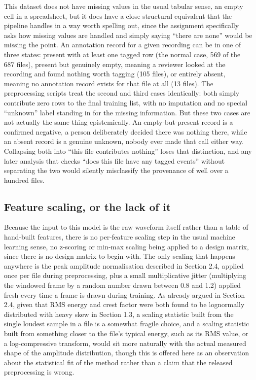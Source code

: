 \documentclass[11pt]{article}
\begin{document}
This dataset does not have missing values in the usual tabular sense, an empty cell in a spreadsheet, but it does have a close structural equivalent that the pipeline handles in a way worth spelling out, since the assignment specifically asks how missing values are handled and simply saying ``there are none'' would be missing the point. An annotation record for a given recording can be in one of three states: present with at least one tagged row (the normal case, 569 of the 687 files), present but genuinely empty, meaning a reviewer looked at the recording and found nothing worth tagging (105 files), or entirely absent, meaning no annotation record exists for that file at all (13 files). The preprocessing scripts treat the second and third cases identically: both simply contribute zero rows to the final training list, with no imputation and no special ``unknown'' label standing in for the missing information. But these two cases are not actually the same thing epistemically. An empty-but-present record is a confirmed negative, a person deliberately decided there was nothing there, while an absent record is a genuine unknown, nobody ever made that call either way. Collapsing both into ``this file contributes nothing'' loses that distinction, and any later analysis that checks ``does this file have any tagged events'' without separating the two would silently misclassify the provenance of well over a hundred files.

\subsection{Feature scaling, or the lack of it}

Because the input to this model is the raw waveform itself rather than a table of hand-built features, there is no per-feature scaling step in the usual machine learning sense, no z-scoring or min-max scaling being applied to a design matrix, since there is no design matrix to begin with. The only scaling that happens anywhere is the peak amplitude normalisation described in Section 2.4, applied once per file during preprocessing, plus a small multiplicative jitter (multiplying the windowed frame by a random number drawn between 0.8 and 1.2) applied fresh every time a frame is drawn during training. As already argued in Section 2.4, given that RMS energy and crest factor were both found to be lognormally distributed with heavy skew in Section 1.3, a scaling statistic built from the single loudest sample in a file is a somewhat fragile choice, and a scaling statistic built from something closer to the file's typical energy, such as its RMS value, or a log-compressive transform, would sit more naturally with the actual measured shape of the amplitude distribution, though this is offered here as an observation about the statistical fit of the method rather than a claim that the released preprocessing is wrong.
\end{document}
